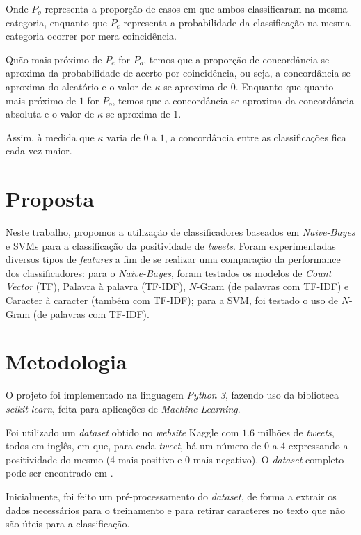 \documentclass[conference]{IEEEtran}
\begin{document}
Onde $P_o$ representa a proporção de casos em que ambos classificaram na mesma categoria, enquanto que $P_e$ representa a probabilidade da classificação na mesma categoria ocorrer por mera coincidência.

Quão mais próximo de $P_e$ for $P_o$, temos que a proporção de concordância se aproxima da probabilidade de acerto por coincidência, ou seja, a concordância se aproxima do aleatório e o valor de $\kappa$ se aproxima de $0$. Enquanto que quanto mais próximo de $1$ for $P_o$, temos que a concordância se aproxima da concordância absoluta e o valor de $\kappa$ se aproxima de $1$.

Assim, à medida que $\kappa$ varia de $0$ a $1$, a concordância entre as classificações fica cada vez maior.

\section{Proposta}

Neste trabalho, propomos a utilização de classificadores baseados em \textit{Naive-Bayes} e SVMs para a classificação da positividade de \textit{tweets}. Foram experimentadas diversos tipos de \textit{features} a fim de se realizar uma comparação da performance dos classificadores: para o \textit{Naive-Bayes}, foram testados os modelos de \textit{Count Vector} (TF), Palavra à palavra (TF-IDF), $N$-Gram (de palavras com TF-IDF) e Caracter à caracter (também com TF-IDF); para a SVM, foi testado o uso de $N$-Gram (de palavras com TF-IDF).

\section{Metodologia}

O projeto foi implementado na linguagem \textit{Python 3}, fazendo uso da biblioteca \textit{scikit-learn}, feita para aplicações de \textit{Machine Learning}.

Foi utilizado um \textit{dataset} obtido no \textit{website} Kaggle com $1.6$ milhões de \textit{tweets}, todos em inglês, em que, para cada \textit{tweet}, há um número de $0$ a $4$ expressando a positividade do mesmo (4 mais positivo e 0 mais negativo). O \textit{dataset} completo pode ser encontrado em \cite{dataset_completo}.

Inicialmente, foi feito um pré-processamento do \textit{dataset}, de forma a extrair os dados necessários para o treinamento e para retirar caracteres no texto que não são úteis para a classificação.
\end{document}
